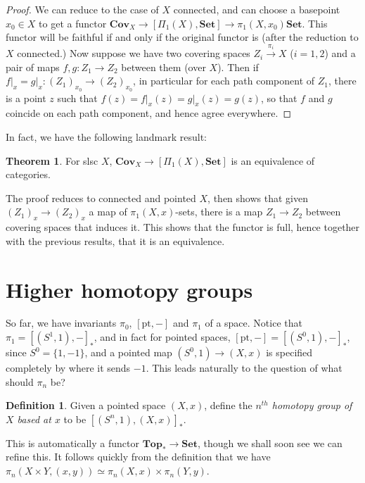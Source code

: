 \documentclass{tufte-handout}
\def\pt {\mathrm{pt}}
\def\Set {\mathbf{Set}}
\def\Top {\mathbf{Top}}
\def\Cov {\mathbf{Cov}}
\theoremstyle{definition}
\newtheorem{definition}{Definition}
\newtheorem{theorem}{Theorem}
\begin{document}
\begin{proof}
We can reduce to the case of $X$ connected, and can choose a basepoint $x_0\in X$ to get a functor $\Cov_X \to [\Pi_1(X),\Set] \to \pi_1(X,x_0)\Set$. This functor will be faithful if and only if the original functor is (after the reduction to $X$ connected.) Now suppose we have two covering spaces $Z_i \xrightarrow{\pi_i} X$ ($i=1,2$) and a pair of maps $f,g\colon Z_1 \to Z_2$ between them (over $X$). Then if $f\big|_x =g\big|_x\colon (Z_1)_{x_0} \to (Z_2)_{x_0}$, in particular for each path component of $Z_1$, there is a point $z$ such that $f(z) = f\big|_x(z) =g\big|_x(z) = g(z)$, so that $f$ and $g$ coincide on each path component, and hence agree everywhere.
\end{proof}

In fact, we have the following landmark result:

\begin{theorem}
For slsc $X$, $\Cov_X\to [\Pi_1(X),\Set]$ is an equivalence of categories.
\end{theorem}

The proof reduces to connected and pointed $X$, then shows that given $(Z_1)_x \to (Z_2)_x$ a map of $\pi_1(X,x)$-sets, there is a map $Z_1 \to Z_2$ between covering spaces that induces it. This shows that the functor is full, hence together with the previous results, that it is an equivalence.

\section{Higher homotopy groups}

So far, we have invariants $\pi_0$, $[\pt,-]$ and $\pi_1$ of a space. Notice that $\pi_1 = [(S^1,1),-]_*$, and in fact for pointed spaces, $[\pt,-] = [(S^0,1),-]_*$, since $S^0 = \{1,-1\}$, and a pointed map $(S^0,1) \to (X,x)$ is specified completely by where it sends $-1$. This leads naturally to the question of what should $\pi_n$ be?

\begin{definition}
Given a pointed space $(X,x)$, define the \emph{$n^{th}$ homotopy group of $X$ based at $x$} to be $[(S^n,1),(X,x)]_*$.
\end{definition}

This is automatically a functor $\Top_* \to \Set$, though we shall soon see we can refine this. It follows quickly from the definition that we have $\pi_n(X\times Y, (x,y)) \simeq \pi_n(X,x)\times \pi_n(Y,y)$.
\end{document}
